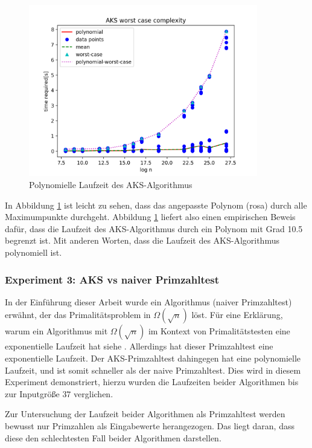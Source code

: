 \documentclass[12pt,oneside]{article}
\theoremstyle{remark}
\theoremstyle{definition}
\begin{document}
\begin{figure}[h]
\includegraphics[width=10cm]{plots/aks_worst_case.png}
\centering
\caption{Polynomielle Laufzeit des AKS-Algorithmus}
\label{worst-case-aks}
\end{figure}
In Abbildung \ref{worst-case-aks} ist leicht zu sehen, dass das angepasste Polynom (rosa) durch alle Maximumpunkte durchgeht.\newline
Abbildung \ref{worst-case-aks} liefert also einen empirischen Beweis dafür, dass die Laufzeit des AKS-Algorithmus durch ein Polynom mit Grad 10.5 begrenzt ist. Mit anderen Worten, dass die Laufzeit des AKS-Algorithmus polynomiell ist.

\newpage

\subsubsection{Experiment 3: AKS vs naiver Primzahltest}
In der Einführung dieser Arbeit wurde ein Algorithmus (naiver Primzahltest) erwähnt, der das Primalitätsproblem in $\Omega(\sqrt{n})$ löst. Für eine Erklärung, warum ein Algorithmus mit $\Omega(\sqrt{n})$ im Kontext von Primalitätstesten eine exponentielle Laufzeit hat siehe \cite{stackPT}. Allerdings hat dieser Primzahltest eine exponentielle Laufzeit. Der AKS-Primzahltest dahingegen hat eine polynomielle Laufzeit, und ist somit schneller als der naive Primzahltest. Dies wird in diesem Experiment demonstriert, hierzu wurden die Laufzeiten beider Algorithmen bis zur Inputgröße $37$ verglichen.  

Zur Untersuchung der Laufzeit beider Algorithmen als Primzahltest werden bewusst nur Primzahlen als Eingabewerte herangezogen. Das liegt daran, dass diese den schlechtesten Fall beider Algorithmen darstellen.\newline
\end{document}
